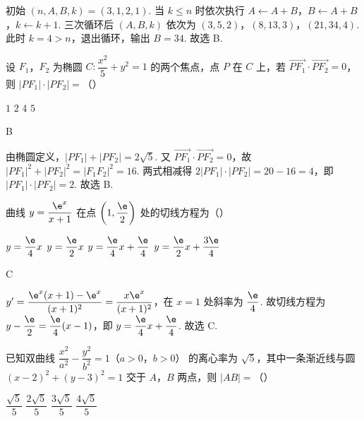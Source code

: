 \begin{solution}
初始 \((n,A,B,k)=(3,1,2,1)\). 当 \(k\leqslant n\) 时依次执行 \(A\leftarrow A+B\)，\(B\leftarrow A+B\)，\(k\leftarrow k+1\). 三次循环后 \((A,B,k)\) 依次为 \((3,5,2)\)，\((8,13,3)\)，\((21,34,4)\). 此时 \(k=4>n\)，退出循环，输出 \(B=34\). 故选 B.
\end{solution}

\begin{problem}
设 \(F_1\)，\(F_2\) 为椭圆 \(C:\dfrac{x^2}{5}+y^2=1\) 的两个焦点，点 \(P\) 在 \(C\) 上，若 \(\overrightarrow{PF_1}\cdot\overrightarrow{PF_2}=0\)，则 \(\left|PF_1\right|\cdot\left|PF_2\right|=\)（\quad）

\choices
    {\(1\)}
    {\(2\)}
    {\(4\)}
    {\(5\)}
\end{problem}

\begin{answer}
B
\end{answer}

\begin{solution}
由椭圆定义，\(\left|PF_1\right|+\left|PF_2\right|=2\sqrt5\). 又 \(\overrightarrow{PF_1}\cdot\overrightarrow{PF_2}=0\)，故 \(\left|PF_1\right|^2+\left|PF_2\right|^2=\left|F_1F_2\right|^2=16\). 两式相减得 \(2\left|PF_1\right|\cdot\left|PF_2\right|=20-16=4\)，即 \(\left|PF_1\right|\cdot\left|PF_2\right|=2\). 故选 B.
\end{solution}

\begin{problem}
曲线 \(y=\dfrac{\e^x}{x+1}\) 在点 \(\left(1,\dfrac{\e}{2}\right)\) 处的切线方程为（\quad）

\choices
    {\(y=\dfrac{\e}{4}x\)}
    {\(y=\dfrac{\e}{2}x\)}
    {\(y=\dfrac{\e}{4}x+\dfrac{\e}{4}\)}
    {\(y=\dfrac{\e}{2}x+\dfrac{3\e}{4}\)}
\end{problem}

\begin{answer}
C
\end{answer}

\begin{solution}
\(y'=\dfrac{\e^x(x+1)-\e^x}{(x+1)^2}=\dfrac{x\e^x}{(x+1)^2}\)，在 \(x=1\) 处斜率为 \(\dfrac{\e}{4}\). 故切线方程为 \(y-\dfrac{\e}{2}=\dfrac{\e}{4}(x-1)\)，即 \(y=\dfrac{\e}{4}x+\dfrac{\e}{4}\). 故选 C.
\end{solution}

\begin{problem}
已知双曲线 \(\dfrac{x^2}{a^2}-\dfrac{y^2}{b^2}=1\)（\(a>0\)，\(b>0\)） 的离心率为 \(\sqrt{5}\)，其中一条渐近线与圆 \(\left(x-2\right)^2+\left(y-3\right)^2=1\) 交于 \(A\)，\(B\) 两点，则 \(|AB|=\)（\quad）

\choices
    {\(\dfrac{\sqrt{5}}{5}\)}
    {\(\dfrac{2\sqrt{5}}{5}\)}
    {\(\dfrac{3\sqrt{5}}{5}\)}
    {\(\dfrac{4\sqrt{5}}{5}\)}
\end{problem}

